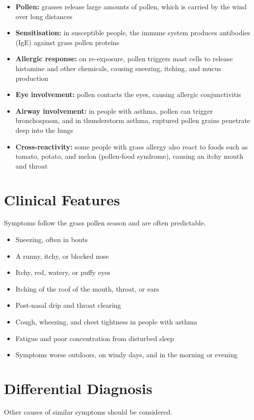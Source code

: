\begin{itemize}
    \item \textbf{Pollen:} grasses release large amounts of pollen, which is carried by the wind over long distances
    \item \textbf{Sensitisation:} in susceptible people, the immune system produces antibodies (IgE) against grass pollen proteins
    \item \textbf{Allergic response:} on re-exposure, pollen triggers mast cells to release histamine and other chemicals, causing sneezing, itching, and mucus production
    \item \textbf{Eye involvement:} pollen contacts the eyes, causing allergic conjunctivitis
    \item \textbf{Airway involvement:} in people with asthma, pollen can trigger bronchospasm, and in thunderstorm asthma, ruptured pollen grains penetrate deep into the lungs
    \item \textbf{Cross-reactivity:} some people with grass allergy also react to foods such as tomato, potato, and melon (pollen-food syndrome), causing an itchy mouth and throat
\end{itemize}

\section*{Clinical Features}
Symptoms follow the grass pollen season and are often predictable.

\begin{itemize}
    \item Sneezing, often in bouts
    \item A runny, itchy, or blocked nose
    \item Itchy, red, watery, or puffy eyes
    \item Itching of the roof of the mouth, throat, or ears
    \item Post-nasal drip and throat clearing
    \item Cough, wheezing, and chest tightness in people with asthma
    \item Fatigue and poor concentration from disturbed sleep
    \item Symptoms worse outdoors, on windy days, and in the morning or evening
\end{itemize}

\section*{Differential Diagnosis}
Other causes of similar symptoms should be considered.

